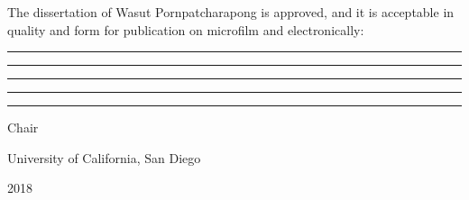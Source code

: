 \newpage
\thispagestyle{plain}


\doublespacing

\vspace*{\fill}

\begin{spacing}{1.0}
\noindent The dissertation of Wasut Pornpatcharapong is approved, and it is acceptable in quality and form
for publication on microfilm and electronically:
\end{spacing}

\vspace{0.75cm}

\par\noindent\rule{\textwidth}{0.5pt}

\vspace{0.35cm}

\par\noindent\rule{\textwidth}{0.5pt}

\vspace{0.35cm}

\par\noindent\rule{\textwidth}{0.5pt}

\vspace{0.35cm}

\par\noindent\rule{\textwidth}{0.5pt}

\vspace{0.35cm}

\par\noindent\rule{\textwidth}{0.5pt} 

\vspace{-0.3cm}

{\hfill Chair}

\begin{center}
    University of California, San Diego
 
    2018
\end{center}

\vspace*{\fill}
